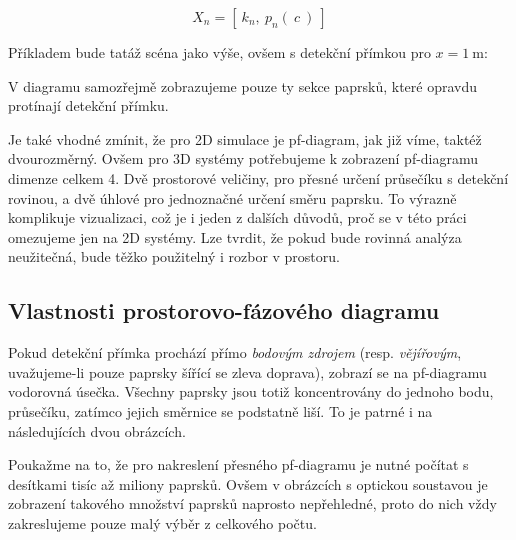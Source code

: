 \[ X_n = [\ k_n,\ p_n(\ c\ )\ ] \]

Příkladem bude tatáž scéna jako výše, ovšem s detekční přímkou pro $x = 1\ \mathrm{m}$:


V diagramu samozřejmě zobrazujeme pouze ty sekce paprsků, které opravdu protínají detekční přímku.

Je také vhodné zmínit, že pro 2D simulace je pf-diagram, jak již víme, taktéž dvourozměrný. Ovšem pro 3D systémy potřebujeme k zobrazení pf-diagramu dimenze celkem 4. Dvě prostorové veličiny, pro přesné určení průsečíku s detekční rovinou, a dvě úhlové pro jednoznačné určení směru paprsku. To výrazně komplikuje vizualizaci, což je i jeden z dalších důvodů, proč se v této práci omezujeme jen na 2D systémy. Lze tvrdit, že pokud bude rovinná analýza neužitečná, bude těžko použitelný i rozbor v prostoru.


\subsection{Vlastnosti prostorovo-fázového diagramu}
\label{sub:analyzasystemu_vlastnostipfdiagramu}

Pokud detekční přímka prochází přímo \emph{bodovým zdrojem} (resp. \emph{vějířovým}, uvažujeme-li pouze paprsky šířící se zleva doprava), zobrazí se na pf-diagramu vodorovná úsečka. Všechny paprsky jsou totiž koncentrovány do jednoho bodu, průsečíku, zatímco jejich směrnice se podstatně liší. To je patrné i na následujících dvou obrázcích.

Poukažme na to, že pro nakreslení přesného pf-diagramu je nutné počítat s desítkami tisíc až miliony paprsků. Ovšem v obrázcích s optickou soustavou je zobrazení takového množství paprsků naprosto nepřehledné, proto do nich vždy zakreslujeme pouze malý výběr z celkového počtu.


